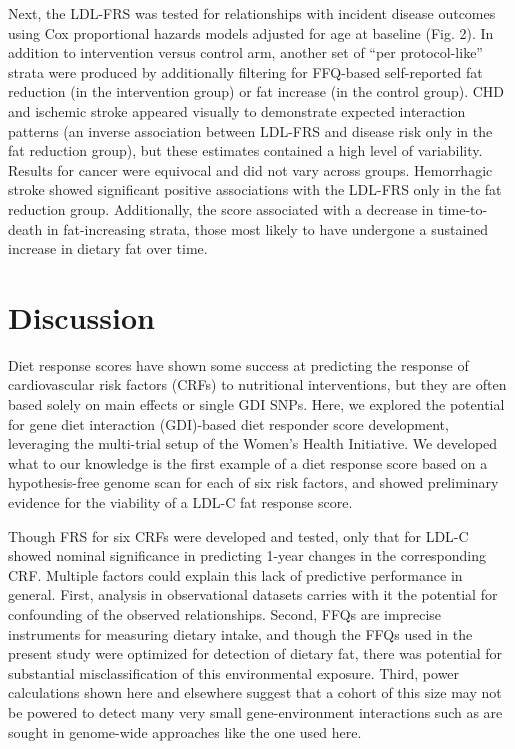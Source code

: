 \documentclass[]{article}
\begin{document}
Next, the LDL-FRS was tested for relationships with incident disease
outcomes using Cox proportional hazards models adjusted for age at
baseline (Fig. 2). In addition to intervention versus control arm,
another set of ``per protocol-like'' strata were produced by
additionally filtering for FFQ-based self-reported fat reduction (in the
intervention group) or fat increase (in the control group). CHD and
ischemic stroke appeared visually to demonstrate expected interaction
patterns (an inverse association between LDL-FRS and disease risk only
in the fat reduction group), but these estimates contained a high level
of variability. Results for cancer were equivocal and did not vary
across groups. Hemorrhagic stroke showed significant positive
associations with the LDL-FRS only in the fat reduction group.
Additionally, the score associated with a decrease in time-to-death in
fat-increasing strata, those most likely to have undergone a sustained
increase in dietary fat over time.

\hypertarget{discussion}{%
\section{Discussion}\label{discussion}}

Diet response scores have shown some success at predicting the response
of cardiovascular risk factors (CRFs) to nutritional interventions, but
they are often based solely on main effects or single GDI SNPs. Here, we
explored the potential for gene diet interaction (GDI)-based diet
responder score development, leveraging the multi-trial setup of the
Women's Health Initiative. We developed what to our knowledge is the
first example of a diet response score based on a hypothesis-free genome
scan for each of six risk factors, and showed preliminary evidence for
the viability of a LDL-C fat response score.

Though FRS for six CRFs were developed and tested, only that for LDL-C
showed nominal significance in predicting 1-year changes in the
corresponding CRF. Multiple factors could explain this lack of
predictive performance in general. First, analysis in observational
datasets carries with it the potential for confounding of the observed
relationships. Second, FFQs are imprecise instruments for measuring
dietary intake, and though the FFQs used in the present study were
optimized for detection of dietary fat, there was potential for
substantial misclassification of this environmental exposure. Third,
power calculations shown here and elsewhere suggest that a cohort of
this size may not be powered to detect many very small gene-environment
interactions such as are sought in genome-wide approaches like the one
used here.
\end{document}
